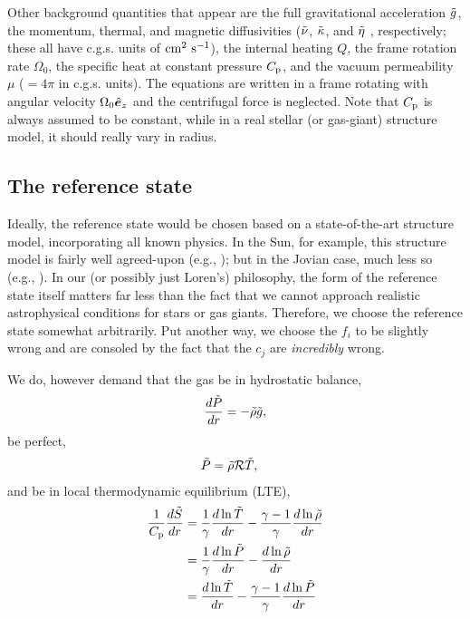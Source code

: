 \documentclass[12pt]{article}
\numberwithin{equation}{section}
\begin{document}
	Other background quantities that appear are the full gravitational acceleration $\tilde{g}$, the momentum, thermal, and magnetic diffusivities ($\tilde{\nu}$, $\tilde{\kappa}$, and $\tilde{\eta}$ , respectively; these all have c.g.s. units of $\rm{cm^2\ s^{-1}}$), the internal heating $Q$, the frame rotation rate $\Omega_0$, the specific heat at constant pressure $C_{\rm{p}}$, and the vacuum permeability $\mu$ ($=4\pi$ in c.g.s. units). The equations are written in a frame rotating with angular velocity $\Omega_0\hat{\bm{e}}_z$ and the centrifugal force is neglected. Note that $C_{\rm{p}}$ is always assumed to be constant, while in a real stellar (or gas-giant) structure model, it should really vary in radius.
	
	\subsection{The reference state}
	Ideally, the reference state would be chosen based on a state-of-the-art structure model, incorporating all known physics. In the Sun, for example, this structure model is fairly well agreed-upon (e.g., \citealt{ChristensenDalsgaard1996}); but in the Jovian case, much less so (e.g., \citealt{Guillot2005}). In our (or possibly just Loren's) philosophy, the form of the reference state itself matters far less than the fact that we cannot approach realistic astrophysical conditions for stars or gas giants. Therefore, we choose the reference state somewhat arbitrarily. Put another way, we choose the $f_i$ to be slightly wrong and are consoled by the fact that the $c_j$ are \textit{incredibly} wrong. 
	
	We do, however demand that the gas be in hydrostatic balance,
	\begin{align}\label{eq:dimhydro}
	\frac{d\tilde{P}}{dr}= -\tilde{\rho} \tilde{g},
	\end{align}
	be perfect,
	\begin{align}
	\tilde{P} &= \tilde{\rho}\mathcal{R} \tilde{T},\label{eq:dimidgas}
	\end{align}
	and be in local thermodynamic equilibrium (LTE), 
	\begin{subequations}\label{eq:dimfirstlaw}
	\begin{align}
		\frac{1}{C_{\rm{p}}}\frac{d\tilde{S}}{dr}&=\frac{1}{\gamma}\frac{d\ln\tilde{T}}{dr} - \frac{\gamma - 1}{\gamma}\frac{d\ln\tilde{\rho}}{dr}\label{eq:dimfirstlawtmprho}\\
		&=\frac{1}{\gamma}\frac{d\ln\tilde{P}}{dr} - \frac{d\ln\tilde{\rho}}{dr}\label{eq:dimfirstlawprsrho}\\
		&= \frac{d\ln\tilde{T}}{dr} - \frac{\gamma - 1}{\gamma}\frac{d\ln\tilde{P}}{dr}\label{eq:dimfirstlawtmpprs}
	\end{align}
	\label{eq:firstlaw3}
\end{subequations}
\end{document}
